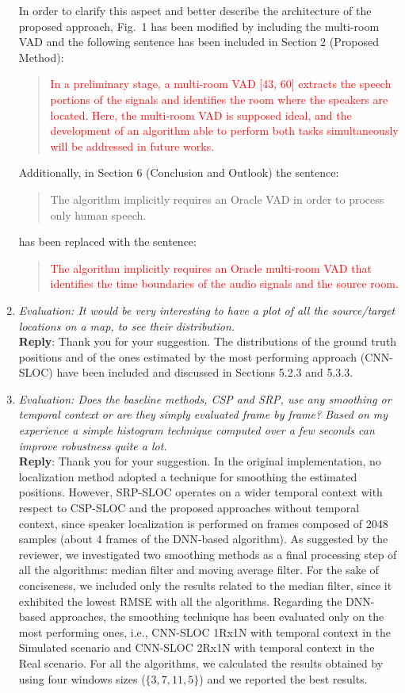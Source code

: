 \documentclass[11pt, technote, letterpaper, oneside, onecolumn]{IEEEtran}
\begin{document}
\begin{enumerate}
In order to clarify this aspect and better describe the architecture of the proposed approach, Fig.~1 has been modified by including the multi-room VAD and the following sentence has been included in Section 2 (Proposed Method):
\begin{quote}
\textcolor{red}{
In a preliminary stage, a multi-room VAD [43, 60] extracts the speech portions of the signals and identifies the room where the speakers are located. Here, the multi-room VAD is supposed ideal, and the development of an algorithm able to perform both tasks simultaneously will be addressed in future works.}
\end{quote}

Additionally, in Section 6 (Conclusion and Outlook) the sentence:
\begin{quote}
The algorithm implicitly requires an Oracle VAD in order to process only human
speech.
\end{quote}

has been replaced with the sentence:
\begin{quote}
\textcolor{red}{The algorithm implicitly requires an Oracle multi-room VAD that identifies the time boundaries of the audio signals and the source room.}
 \end{quote}
 
\item \textit{Evaluation: It would be very interesting to have a plot of all the source/target locations on a map, to see their distribution.\\}
\textbf{Reply}: Thank you for your suggestion. The distributions of the ground truth positions and of the ones estimated by the most performing approach (CNN-SLOC) have been included and discussed in Sections 5.2.3 and 5.3.3.

\item \textit{Evaluation: Does the baseline methods, CSP and SRP, use any smoothing or temporal context or are they simply evaluated frame by frame? Based on my experience a simple histogram technique computed over a few seconds can improve robustness quite a lot.\\} \label{resp:smooth}
\textbf{Reply}: Thank you for your suggestion. In the original implementation, no localization method adopted a technique for smoothing the estimated positions. However, SRP-SLOC operates on a wider temporal context with respect to CSP-SLOC and the proposed approaches without temporal context, since speaker localization is performed on frames composed of 2048 samples (about 4 frames of the DNN-based algorithm). As suggested by the reviewer, we investigated two smoothing methods as a final processing step of all the algorithms: median filter and moving average filter. For the sake of conciseness, we included only the results related to the median filter, since it exhibited the lowest RMSE with all the algorithms. Regarding the DNN-based approaches, the smoothing technique has been evaluated only on the most performing ones, i.e., CNN-SLOC 1Rx1N with temporal context in the Simulated scenario and CNN-SLOC 2Rx1N with temporal context in the Real scenario. For all the algorithms, we calculated the results obtained by using four windows sizes ($\{3,7,11,5\}$) and we reported the best results.


\end{enumerate}
\end{document}
